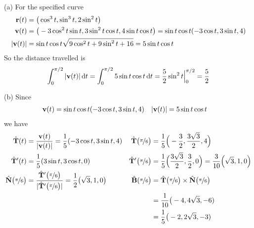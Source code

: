 \begin{solution}
(a)  For the specified curve
\begin{align*}
\mathbf{r}(t)&=\big(\cos^3t,\sin^3t,2\sin^2t\big)\\
\mathbf{v}(t)&=\big(-3\cos^2t\sin t,3\sin^2t\cos t,4\sin t\cos t\big)
=\sin t\cos t (-3\cos t,3\sin t, 4)\\
|\mathbf{v}(t)|&=\sin t\cos t\sqrt{9\cos^2t+9\sin^2t+16}=5\sin t\cos t
\end{align*}
So the distance travelled is 
\begin{equation*}
\int_0^{\pi/2}|\mathbf{v}(t)|\,\mathrm{d}t=\int_0^{\pi/2} 5\sin t\cos t\,\mathrm{d}t = \frac{5}{2}\sin^2t\Big|_0^{\pi/2}
=\frac{5}{2}
\end{equation*}

(b) Since
\begin{align*}
\mathbf{v}(t)&=\sin t\cos t (-3\cos t,3\sin t, 4) &
|\mathbf{v}(t)|&=5\sin t\cos t
\end{align*}
we have
\begin{align*}
\hat{\mathbf{T}}(t) &= \frac{\mathbf{v}(t)}{|\mathbf{v}(t)|} 
           =\frac{1}{5}(-3\cos t,3\sin t, 4) &
\hat{\mathbf{T}}\big(\nicefrac{\pi}{6}\big)
           &=\frac{1}{5}\Big(-\frac{3}{2},\frac{3\sqrt{3}}{2}, 4\Big) \\
\hat{\mathbf{T}}'(t) &=\frac{1}{5}(3\sin t,3\cos t, 0) &
\hat{\mathbf{T}}'\big(\nicefrac{\pi}{6}\big)
           &=\frac{1}{5}\Big(\frac{3\sqrt{3}}{2}, \frac{3}{2}, 0\Big)
            = \frac{3}{10} \Big(\sqrt{3}, 1, 0\Big)\\
\hat{\mathbf{N}}\big(\nicefrac{\pi}{6}\big) &= \frac{\hat{\mathbf{T}}'\big(\nicefrac{\pi}{6}\big)}
                                     {|\hat{\mathbf{T}}'\big(\nicefrac{\pi}{6}\big)|}
                  =\frac{1}{2}\big(\sqrt{3},1,0\big) &
\hat{\mathbf{B}}(\nicefrac{\pi}{6}\big)
&= \hat{\mathbf{T}}\big(\nicefrac{\pi}{6}\big)\times
             \hat{\mathbf{N}}\big(\nicefrac{\pi}{6}\big) \\
& & &=\frac{1}{10}\big(-4,4\sqrt{3},-6) \\
& & &=\frac{1}{5}\big(-2,2\sqrt{3},-3) 
\end{align*}
\end{solution}


